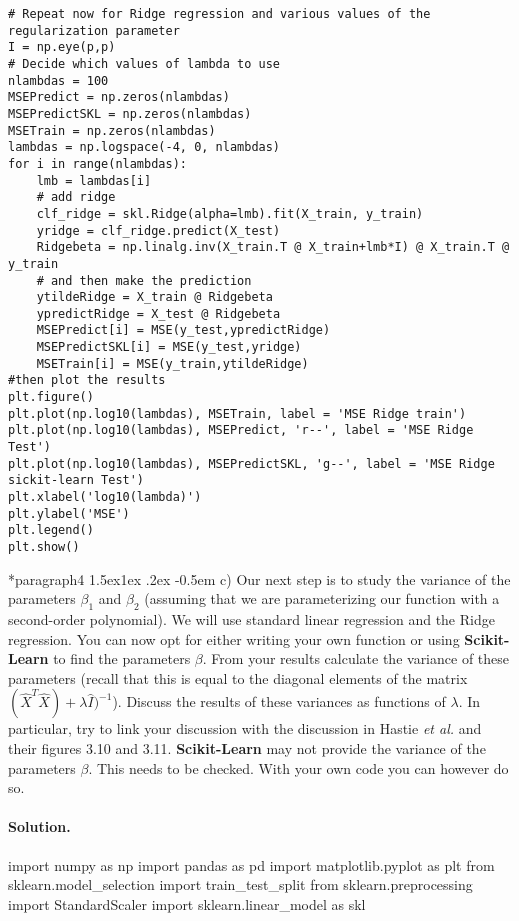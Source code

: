 \documentclass[%
oneside,                 %
final,                   %
10pt]{article}
\makeatletter
\newenvironment{doconceexercise}{}{}
\newcommand\subex{\@startsection*{paragraph}{4}{\z@}%
                  {1.5ex\@plus1ex \@minus.2ex}%
                  {-0.5em}%
                  {\normalfont\normalsize\bfseries}}
\makeatother
\begin{document}
\begin{doconceexercise}
\begin{verbatim}
# Repeat now for Ridge regression and various values of the regularization parameter
I = np.eye(p,p)
# Decide which values of lambda to use
nlambdas = 100
MSEPredict = np.zeros(nlambdas)
MSEPredictSKL = np.zeros(nlambdas)
MSETrain = np.zeros(nlambdas)
lambdas = np.logspace(-4, 0, nlambdas)
for i in range(nlambdas):
    lmb = lambdas[i]
    # add ridge
    clf_ridge = skl.Ridge(alpha=lmb).fit(X_train, y_train)
    yridge = clf_ridge.predict(X_test)
    Ridgebeta = np.linalg.inv(X_train.T @ X_train+lmb*I) @ X_train.T @ y_train
    # and then make the prediction
    ytildeRidge = X_train @ Ridgebeta
    ypredictRidge = X_test @ Ridgebeta
    MSEPredict[i] = MSE(y_test,ypredictRidge)
    MSEPredictSKL[i] = MSE(y_test,yridge)
    MSETrain[i] = MSE(y_train,ytildeRidge)
#then plot the results
plt.figure()
plt.plot(np.log10(lambdas), MSETrain, label = 'MSE Ridge train')
plt.plot(np.log10(lambdas), MSEPredict, 'r--', label = 'MSE Ridge Test')
plt.plot(np.log10(lambdas), MSEPredictSKL, 'g--', label = 'MSE Ridge sickit-learn Test')
plt.xlabel('log10(lambda)')
plt.ylabel('MSE')
plt.legend()
plt.show()
\end{verbatim}

\subex{c)}
Our next step is to study the variance of the parameters $\beta_1$ and $\beta_2$ (assuming that we are parameterizing our function with a second-order polynomial). We will use standard linear regression and the Ridge regression.  You can now opt for either writing your own function or using \textbf{Scikit-Learn} to find the parameters $\beta$. From your results calculate the variance of these parameters (recall that this is equal to the diagonal elements of the matrix $(\hat{X}^T\hat{X})+\lambda\hat{I})^{-1}$). Discuss the results of these variances as functions of $\lambda$. In particular, try to link your discussion with the discussion in Hastie \emph{et al.} and their figures 3.10 and  3.11. \textbf{Scikit-Learn} may not provide the variance of the parameters $\beta$. This needs to be checked. With your own code you can however do so.


\paragraph{Solution.}
import numpy as np
import pandas as pd
import matplotlib.pyplot as plt
from sklearn.model_selection import train_test_split
from sklearn.preprocessing import StandardScaler
import sklearn.linear_model as skl


\end{doconceexercise}
\end{document}
